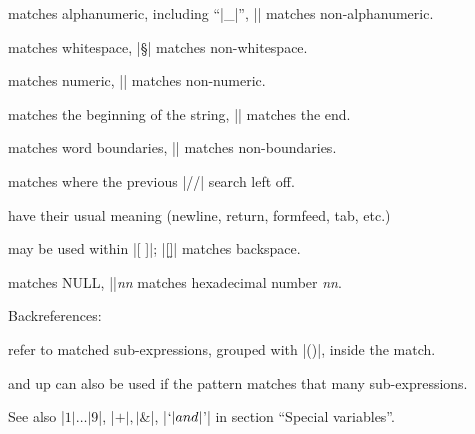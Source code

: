 \begin{enum}{1cm}

matches alphanumeric, including ``|_|'', |\W| matches non-alphanumeric.

matches whitespace, |\S| matches non-whitespace.

matches numeric, |\D| matches non-numeric.

matches the beginning of the string, |\Z| matches the end.

matches word boundaries, |\B| matches non-boundaries.

matches where the previous |//| search left off.

have their usual meaning (newline, return, formfeed, tab, etc.)

may be used within |[ ]|; |[\b]| matches backspace.

 matches NULL, |\x|{\it nn} matches hexadecimal number {\it nn}.
\end{enum}

\xtraspace
Backreferences:

\begin{enum}{1cm}

refer to matched sub-expressions, grouped with |()|, inside the match. 

and up can also be used if the pattern
matches that many sub-expressions. 

\end{enum}

See also |$1|\ldots|$9|, |$+|, |$&|, |$`| and |$'| in section ``Special
variables''.

